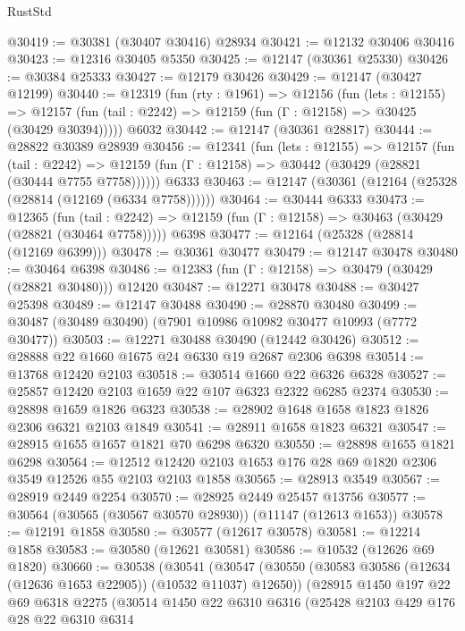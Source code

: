 \begin{lexlean}{RustStd}
\begin{coremodule}
@30419 := @30381 (@30407 @30416) @28934
@30421 := @12132 @30406 @30416
@30423 := @12316 @30405 @5350
@30425 := @12147 (@30361 @25330)
@30426 := @30384 @25333
@30427 := @12179 @30426
@30429 := @12147 (@30427 @12199)
@30440 := @12319
    (fun (rty : @1961) =>
    @12156
      (fun (lets : @12155) =>
      @12157 (fun (tail : @2242) => @12159 (fun (Γ : @12158) => @30425 (@30429 @30394)))))
    @6032
@30442 := @12147 (@30361 @28817)
@30444 := @28822 @30389 @28939
@30456 := @12341
    (fun (lets : @12155) =>
    @12157
      (fun (tail : @2242) =>
      @12159 (fun (Γ : @12158) => @30442 (@30429 (@28821 (@30444 @7755 @7758))))))
    @6333
@30463 := @12147 (@30361 (@12164 (@25328 (@28814 (@12169 (@6334 @7758))))))
@30464 := @30444 @6333
@30473 := @12365
    (fun (tail : @2242) => @12159 (fun (Γ : @12158) => @30463 (@30429 (@28821 (@30464 @7758)))))
    @6398
@30477 := @12164 (@25328 (@28814 (@12169 @6399)))
@30478 := @30361 @30477
@30479 := @12147 @30478
@30480 := @30464 @6398
@30486 := @12383 (fun (Γ : @12158) => @30479 (@30429 (@28821 @30480))) @12420
@30487 := @12271 @30478
@30488 := @30427 @25398
@30489 := @12147 @30488
@30490 := @28870 @30480
@30499 := @30487 (@30489 @30490) (@7901 @10986 @10982 @30477 @10993 (@7772 @30477))
@30503 := @12271 @30488 @30490 (@12442 @30426)
@30512 := @28888 @22 @1660 @1675 @24 @6330 @19 @2687 @2306 @6398
@30514 := @13768 @12420 @2103
@30518 := @30514 @1660 @22 @6326 @6328
@30527 := @25857 @12420 @2103 @1659 @22 @107 @6323 @2322 @6285 @2374
@30530 := @28898 @1659 @1826 @6323
@30538 := @28902 @1648 @1658 @1823 @1826 @2306 @6321 @2103 @1849
@30541 := @28911 @1658 @1823 @6321
@30547 := @28915 @1655 @1657 @1821 @70 @6298 @6320
@30550 := @28898 @1655 @1821 @6298
@30564 := @12512 @12420 @2103 @1653 @176 @28 @69 @1820 @2306 @3549 @12526 @55 @2103 @2103 @1858
@30565 := @28913 @3549
@30567 := @28919 @2449 @2254
@30570 := @28925 @2449 @25457 @13756
@30577 := @30564 (@30565 (@30567 @30570 @28930)) (@11147 (@12613 @1653))
@30578 := @12191 @1858
@30580 := @30577 (@12617 @30578)
@30581 := @12214 @1858
@30583 := @30580 (@12621 @30581)
@30586 := @10532 (@12626 @69 @1820)
@30660 := @30538
    (@30541
      (@30547
        (@30550 (@30583 @30586 (@12634 (@12636 @1653 @22905)) (@10532 @11037) @12650))
        (@28915
          @1450
          @197
          @22
          @69
          @6318
          @2275
          (@30514
            @1450
            @22
            @6310
            @6316
            (@25428
              @2103
              @429
              @176
              @28
              @22
              @6310
              @6314

\end{coremodule}
\end{lexlean}
